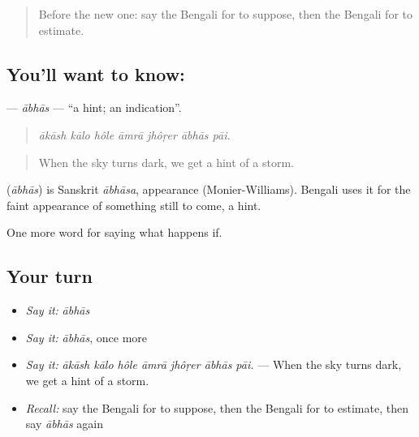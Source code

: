 \label{lesson:BN-C367-abhas}



\begin{quote}
Before the new one: say the Bengali for to suppose, then the Bengali for to estimate.
\end{quote}

\subsection*{You'll want to know: }
\textbf{} — \emph{ābhās} — \textquotedblleft{}a hint; an indication\textquotedblright{}.

\begin{quote}
      
\end{quote}

\begin{quote}
\emph{ākāsh kālo hôle āmrā jhôṛer ābhās pāi.}
\end{quote}

\begin{quote}
When the sky turns dark, we get a hint of a storm.
\end{quote}

\begin{cousinweb}
\textbf{} (\emph{ābhās}) is Sanskrit \emph{ābhāsa}, appearance (Monier-Williams). Bengali uses it for the faint appearance of something still to come, a hint.
\end{cousinweb}

\begin{grammarlens}[title={What you've built}]
One more word for saying what happens if.
\end{grammarlens}

\subsection*{Your turn}
\begin{itemize}
\raggedright
  \item \emph{Say it:} \emph{ābhās}
  \item \emph{Say it:} \emph{ābhās}, once more
  \item \emph{Say it:} \emph{ākāsh kālo hôle āmrā jhôṛer ābhās pāi.} — When the sky turns dark, we get a hint of a storm.
  \item \emph{Recall:} say the Bengali for to suppose, then the Bengali for to estimate, then say \emph{ābhās} again
\end{itemize}

